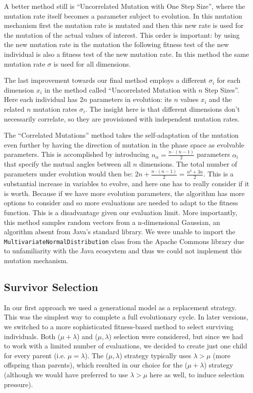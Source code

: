A better method still is ``Uncorrelated Mutation with One Step Size'', where the mutation rate
itself becomes a parameter subject to evolution. In this mutation mechanism first the mutation rate
is mutated and then this new rate is used for the mutation of the actual values of interest. This
order is important: by using the new mutation rate in the mutation the following fitness test of the
new individual is also a fitness test of the new mutation rate. In this method the same mutation
rate $\sigma$ is used for all dimensions.

The last improvement towards our final method employs a different $\sigma_i$ for each dimension
$x_i$ in the method called ``Uncorrelated Mutation with $n$ Step Sizes''. Here each individual has
$2n$ parameters in evolution: its $n$ values $x_i$ and the related $n$ mutation rates $\sigma_i$.
The insight here is that different dimensions don't necessarily correlate, so they are provisioned
with independent mutation rates.

The ``Correlated Mutations'' method takes the self-adaptation of the mutation even further by having
the direction of mutation in the phase space as evolvable parameters. This is accomplished by
introducing $n_\alpha= \frac{n \cdot (n - 1)}{2}$ parameters $\alpha_i$ that specify the mutual
angles between all $n$ dimensions. The total number of parameters under evolution would then be:
$2n+ \frac{n \cdot (n - 1)}{2} = \frac{n^2 + 3n}{2}$. This is a substantial increase in variables to
evolve, and here one has to really consider if it is worth. Because if we have more evolution
parameters, the algorithm has more options to consider and so more evaluations are needed to adapt
to the fitness function. This is a disadvantage given our evaluation limit. More importantly, this
method samples random vectors from a n-dimensional Gaussian, an algorithm absent from Java's
standard library. We were unable to import the \texttt{MultivariateNormalDistribution}
class from the Apache Commons library \cite{wiki:commons} due to unfamiliarity with the Java
ecosystem and thus we could not implement this mutation mechanism.

\subsection{Survivor Selection}
In our first approach we used a generational model as a replacement strategy. This was the simplest
way to complete a full evolutionary cycle. In later versions, we switched to a more sophisticated
fitness-based method to select surviving individuals. Both ($\mu+\lambda$) and ($\mu,\lambda$)
selection were considered, but since we had to work with a limited number of evaluations, we
decided to create just one child for every parent (i.e. $\mu = \lambda$). The ($\mu,\lambda$)
strategy typically uses
$\lambda > \mu$ (more offspring than parents), which resulted in our choice for the ($\mu+\lambda$)
strategy (although we would
have preferred to use $\lambda > \mu$ here as well, to induce
selection pressure).

